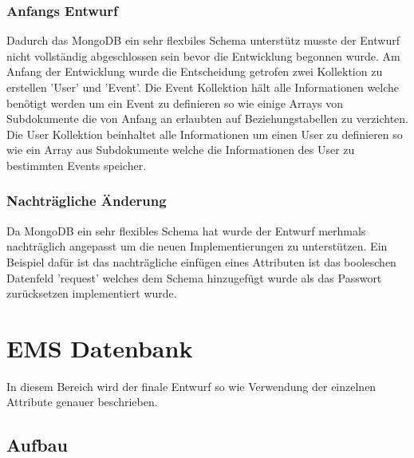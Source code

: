 			\subsubsection*{Anfangs Entwurf}
			Dadurch das MongoDB ein sehr flexbiles Schema unterstütz musste der Entwurf nicht vollständig abgeschlossen sein bevor die Entwicklung begonnen wurde.
			Am Anfang der Entwicklung wurde die Entscheidung getrofen zwei Kollektion zu erstellen 'User' und 'Event'.
			Die Event Kollektion hält alle Informationen welche benötigt werden um ein Event zu definieren so wie einige Arrays von Subdokumente die von Anfang an erlaubten auf Beziehungstabellen zu verzichten.
			Die User Kollektion beinhaltet alle Informationen um einen User zu definieren so wie ein Array aus Subdokumente welche die Informationen des User zu bestimmten Events speicher. 

			\subsubsection*{Nachträgliche Änderung}
				Da MongoDB ein sehr flexibles Schema hat wurde der Entwurf merhmals nachträglich angepasst um die neuen Implementierungen zu unterstützen. 
				Ein Beispiel dafür ist das nachträgliche einfügen eines Attributen ist das booleschen Datenfeld 'request' welches dem Schema hinzugefügt wurde als das Passwort zurücksetzen implementiert wurde.			

			\newpage

	\section{EMS Datenbank}
		In diesem Bereich wird der finale Entwurf so wie Verwendung der einzelnen Attribute genauer beschrieben.
	
		\subsection{Aufbau}
